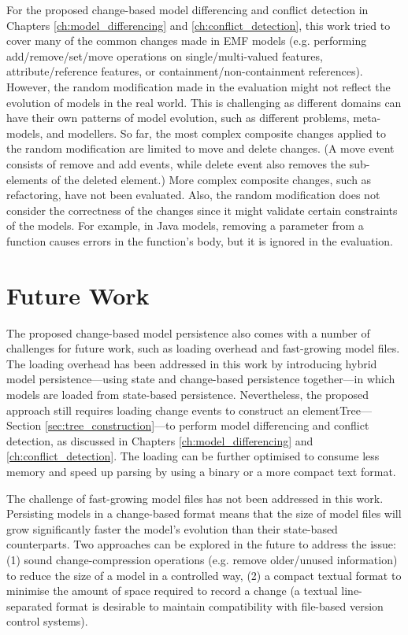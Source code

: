 For the proposed change-based model differencing and conflict detection in Chapters \ref{ch:model_differencing} and \ref{ch:conflict_detection}, this work tried to cover many of the common changes made in EMF models (e.g. performing \textsf{add}/\textsf{remove}/\textsf{set}/\textsf{move} operations on \textsf{single}/\textsf{multi}-\textsf{valued} features, \textsf{attribute}/\textsf{reference} features, or \textsf{containment}/\textsf{non}-\textsf{containment} references). However, the random modification made in the evaluation might not reflect the evolution of models in the real world. This is challenging as different domains can have their own patterns of model evolution, such as different problems, meta-models, and modellers. So far, the most complex composite changes applied to the random modification are limited to \textsf{move} and \textsf{delete} changes. (A \textsf{move} event consists of \textsf{remove} and {add} events, while \textsf{delete} event also removes the sub-elements of the deleted element.) More complex composite changes, such as refactoring, have not been evaluated. Also, the random modification does not consider the correctness of the changes since it might validate certain constraints of the models. For example, in Java \cite{eclipse2018modiscojava} models, removing a parameter from a function causes errors in the function’s body, but it is ignored in the evaluation.

\section{Future Work}
\label{future_work}
The proposed change-based model persistence also comes with a number of challenges for future work, such as loading overhead and fast-growing model files. The loading overhead has been addressed in this work by introducing hybrid model persistence—using state and change-based persistence together—in which models are loaded from state-based persistence. Nevertheless, the proposed approach still requires loading change events to construct an \textsf{elementTree}—Section \ref{sec:tree_construction}—to perform model differencing and conflict detection, as discussed in Chapters \ref{ch:model_differencing} and \ref{ch:conflict_detection}. The loading can be further optimised to consume less memory and speed up parsing by using a binary or a more compact text format.

The challenge of fast-growing model files has not been addressed in this work. Persisting models in a change-based format means that the size of model files will grow significantly faster the model’s evolution than their state-based counterparts. Two approaches can be explored in the future to address the issue: (1) sound change-compression operations (e.g. remove older/unused information) to reduce the size of a model in a controlled way, (2) a compact textual format to minimise the amount of space required to record a change (a textual line-separated format is desirable to maintain compatibility with file-based version control systems).

